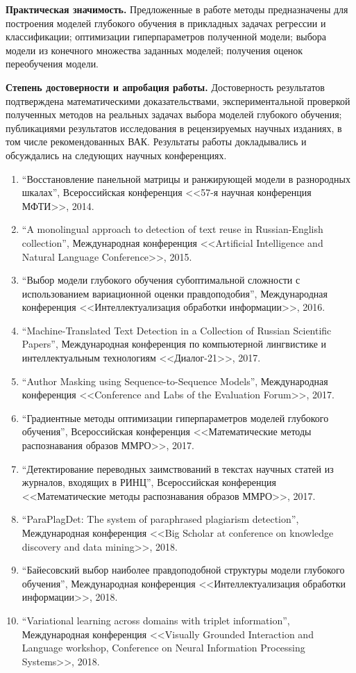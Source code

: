 \documentclass[11pt, a5paper]{dissert}
\theoremstyle{definition}
\begin{document}
\vspace{0.5cm}
\textbf{Практическая значимость.} Предложенные в работе методы предназначены для построения моделей глубокого обучения в прикладных задачах регрессии и классификации; оптимизации гиперпараметров полученной модели; выбора модели из конечного множества заданных моделей; получения оценок переобучения модели.


\vspace{0.5cm}
\textbf{Степень достоверности и апробация работы.} Достоверность результатов подтверждена математическими доказательствами, экспериментальной проверкой полученных методов на реальных задачах выбора моделей глубокого обучения; публикациями результатов исследования в рецензируемых научных изданиях, в том числе рекомендованных ВАК. Результаты работы докладывались и обсуждались на следующих научных конференциях.
\begin{enumerate}
\item ``Восстановление панельной матрицы и ранжирующей модели в разнородных шкалах'', Всероссийская конференция <<57-я научная конференция МФТИ>>, 2014.
\item ``A monolingual approach to detection of text reuse in Russian-English collection'', Международная конференция <<Artificial Intelligence and Natural Language Conference>>, 2015.
\item ``Выбор модели глубокого обучения субоптимальной сложности с использованием вариационной оценки правдоподобия'', Международная конференция <<Интеллектуализация обработки информации>>, 2016.
\item ``Machine-Translated Text Detection in a Collection of Russian
Scientific Papers'', Международная конференция по компьютерной лингвистике и интеллектуальным технологиям <<Диалог-21>>, 2017.
\item ``Author Masking using Sequence-to-Sequence Models'', Международная конференция <<Conference and Labs of the Evaluation Forum>>, 2017.
\item ``Градиентные методы оптимизации гиперпараметров моделей глубокого обучения'', Всероссийская конференция <<Математические методы распознавания образов ММРО>>, 2017.
\item ``Детектирование переводных заимствований в текстах научных статей из журналов, входящих в РИНЦ'', Всероссийская конференция <<Математические методы распознавания образов ММРО>>, 2017.
\item ``ParaPlagDet: The system of paraphrased plagiarism detection'', Международная конференция <<Big Scholar at conference on knowledge discovery and data mining>>, 2018.
\item ``Байесовский выбор наиболее правдоподобной структуры модели глубокого обучения'', Международная конференция <<Интеллектуализация обработки информации>>, 2018.
\item ``Variational learning across domains with triplet
information'', Международная конференция <<Visually Grounded Interaction and Language workshop, Conference on Neural Information Processing Systems>>, 2018.
\end{enumerate}
\end{document}
